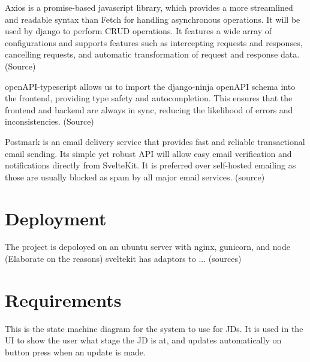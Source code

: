 Axios is a promise-based javascript library, which provides a more streamlined and readable syntax than Fetch for handling asynchronous operations. It will be used by django to perform CRUD operations. It features a wide array of configurations and supports features such as intercepting requests and responses, cancelling requests, and automatic transformation of request and response data. (Source)

openAPI-typescript allows us to import the django-ninja openAPI schema into the frontend, providing type safety and autocompletion. This ensures that the frontend and backend are always in sync, reducing the likelihood of errors and inconsistencies. (Source)

Postmark is an email delivery service that provides fast and reliable transactional email sending. Its simple yet robust API will allow easy email verification and notifications directly from SvelteKit. It is preferred over self-hosted emailing as those are usually blocked as spam by all major email services. (source)

\section{Deployment}
The project is depoloyed on an ubuntu server with nginx, gunicorn, and node (Elaborate on the reasons) sveltekit has adaptors to ... (sources)

\section{Requirements}
This is the state machine diagram for the system to use for JDs. It is used in the UI to show the user what stage the JD is at, and updates automatically on button press when an update is made.

\noindent
{}

\noindent
{}